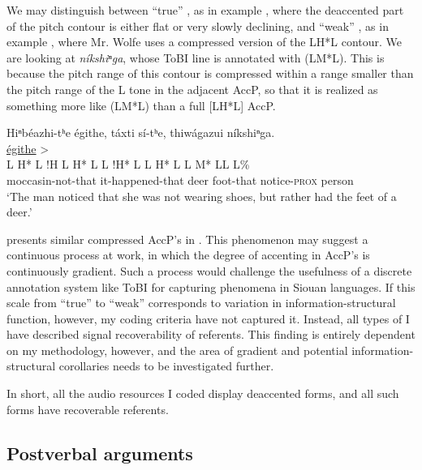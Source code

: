 \documentclass[output=paper]{LSP/langsci}
\begin{document}
We may distinguish between “true” , as in example , where the deaccented part of the pitch contour is either flat or very slowly declining, and “weak” , as in example , where Mr. Wolfe uses a compressed version of the LH*L contour. We are looking at \textit{níkshiⁿga}, whose ToBI line is annotated with (LM*L). This is because the pitch range of this contour is compressed within a range smaller than the pitch range of the L tone in the adjacent AccP, so that it is realized as something more like (LM*L) than a full [LH*L] AccP.

\ea\label{wolfeweakdeaccenting}
Hiⁿbéazhi-tʰe égithe, táxti sí-tʰe, thiwágazui níkshiⁿga.\rmfnm\\
\glll	{}	{\uline{égithe} >}						 			\\
	{\ob L H* L}				{\cb{}!H}	{\ob L H* L\cb}			{\ob L !H* L\cb}				{\ob L H* L}			{\op L M* L\cp\cb{}L L\%}\\
	moccasin-not-that			it-happened-that					deer					foot-that				notice-\textsc{prox}		person\\
\glt	`The man noticed that she was not wearing shoes, but rather had the feet of a deer.'
\z

\citet[121--123]{Mirzayan2011} presents similar compressed AccP’s in . This phenomenon may suggest a continuous process at work, in which the degree of accenting in AccP’s is continuously gradient. Such a process would challenge the usefulness of a discrete annotation system like ToBI for capturing  phenomena in Siouan languages. If this scale from “true” to “weak”  corresponds to variation in information-structural function, however, my coding criteria have not captured it. Instead, all types of  I have described signal recoverability of referents. This finding is entirely dependent on my methodology, however, and the area of gradient  and potential information-structural corollaries needs to be investigated further.

In short, all the audio resources I coded display deaccented forms, and all such forms have recoverable referents.

\subsection{Postverbal arguments}\label{postverbalarguments}
\end{document}
